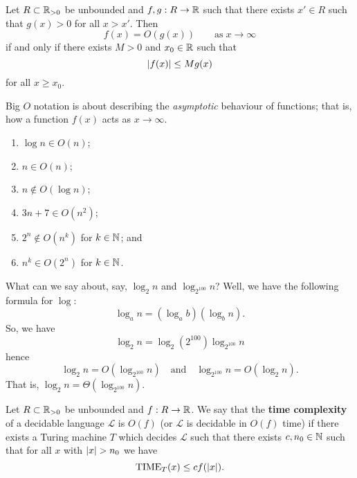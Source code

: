 
\begin{definition}[Big $O$]
    Let 
    $R \subset \mathbb{R}_{>0}$ 
    be unbounded and
    $f,g: R \to \mathbb{R}$
    such that there exists 
    $x' \in R$ 
    such that
    $g(x) > 0$
    for all 
    $x > x'$.
    Then 
    \[
        f(x) = O(g(x)) \qquad \text{as}\;x \to \infty
    \]
    if and only if there exists $M > 0$ and $x_0 \in \mathbb{R}$ such that
    \[
        \left\lvert f(x)\right\rvert \leq Mg(x)
    \]
    for all $x \geq x_0$.
\end{definition}

Big $O$ notation is about describing the \emph{asymptotic} behaviour
of functions; 
that is, how a function $f(x)$ acts as $x \to \infty$.

\begin{example}
    \hfill
    \begin{enumerate}
        \item $\log{n} \in O(n)$;
        \item $n \in O(n)$;
        \item $n \not\in O(\log n)$;
        \item $3n + 7 \in O(n^2)$;
        \item $2^n \not\in O(n^k)$ for $k \in \mathbb{N}$; and
        \item $n^k \in O(2^n)$ for $k \in \mathbb{N}$.
    \end{enumerate}
\end{example}

\begin{example}
    What can we say about, say, $\log_2{n}$ and $\log_{2^{100}} n$?
    Well, we have the following formula for $\log$:
    \[
        \log_an = (\log_ab)(\log_bn).
    \]
    So, we have
    \[
        \log_2n = \log_2(2^{100})\log_{2^{100}}n
    \]
    hence
    \[
        \log_2n = O(\log_{2^{100}}n) 
        \quad\text{and}\quad
        \log_{2^{100}}n = O(\log_2n).
    \]
    That is, $\log_2n = \Theta(\log_{2^{100}}n)$.
\end{example}

\begin{definition}
    Let $R \subset \mathbb{R}_{>0}$ be unbounded
    and $f: R \to \mathbb{R}$.
    We say that the \textbf{time complexity} of a decidable language
    $\mathcal L$ is $O(f)$ (or $\mathcal L$ is decidable in $O(f)$ time)
    if there exists a Turing machine $T$ which decides $\mathcal L$
    such that there exists $c, n_0 \in \mathbb{N}$ such that for all $x$ with 
    $\left\lvert x\right\rvert > n_0$ we have
    \[
        \operatorname{TIME}_T(x) \leq cf(\left\lvert x\right\rvert).
    \]
\end{definition}

